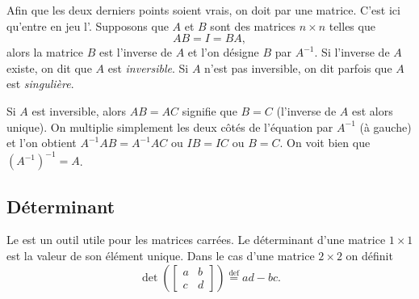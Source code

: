 Afin que les deux derniers points soient vrais, on doit  par une matrice. C’est ici qu’entre en jeu l’\emph{}. Supposons que $A$ et $B$ sont des matrices $n \times n$ telles que
\begin{equation*}
AB = I = BA ,
\end{equation*}
alors la matrice $B$ est l'inverse de $A$ et l'on désigne $B$ par $A^{-1}$.
Si l’inverse de $A$ existe, on dit que $A$ est
\emph{inversible}.
Si $A$ n’est pas inversible, on dit parfois que $A$ est
\emph{singulière}.

Si $A$ est inversible, alors $AB = AC$ signifie que
$B = C$ (l’inverse de $A$ est alors unique).
On multiplie simplement les deux côtés de l’équation par $A^{-1}$ (à gauche) et l'on obtient
$A^{-1}AB = A^{-1}AC$ ou $IB=IC$ ou $B=C$.
On voit bien que ${(A^{-1})}^{-1} = A$.

\subsection{Déterminant}

Le \emph{} est un outil utile pour les matrices carrées. Le déterminant d’une matrice $1 \times 1$ est la valeur de son élément unique. Dans le cas d'une matrice $2 \times 2$ on définit
\begin{equation*}
\det \left(
\begin{bmatrix}
a & b \\
c & d
\end{bmatrix}
\right)
\overset{\text{def}}{=}
ad-bc .
\end{equation*}

